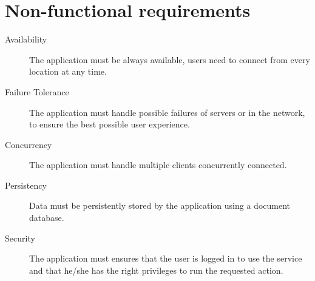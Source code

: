 \section{Non-functional requirements}\label{sec:nonfunctionalrequirements}

\begin{description}
	\item[Availability] The application must be always available, users need
		to connect from every location at any time.
	\item[Failure Tolerance] The application must handle possible failures
		of servers or in the network, to ensure the best possible user
		experience.
	\item[Concurrency] The application must handle multiple clients
		concurrently connected.
	\item[Persistency] Data must be persistently stored by the application
		using a document database.
	\item[Security] The application must ensures that the user is logged in
		to use the service and that he/she has the right privileges to
		run the requested action.
\end{description}
